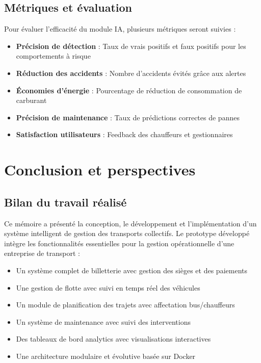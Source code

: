 \documentclass[a4paper, 12pt]{book}
\begin{document}
\section{Métriques et évaluation}

Pour évaluer l'efficacité du module IA, plusieurs métriques seront suivies :

\begin{itemize}
    \item \textbf{Précision de détection} : Taux de vrais positifs et faux positifs pour les comportements à risque
    \item \textbf{Réduction des accidents} : Nombre d'accidents évités grâce aux alertes
    \item \textbf{Économies d'énergie} : Pourcentage de réduction de consommation de carburant
    \item \textbf{Précision de maintenance} : Taux de prédictions correctes de pannes
    \item \textbf{Satisfaction utilisateurs} : Feedback des chauffeurs et gestionnaires
\end{itemize}

\chapter{Conclusion et perspectives}

\section{Bilan du travail réalisé}

Ce mémoire a présenté la conception, le développement et l'implémentation d'un système intelligent de gestion des transports collectifs. Le prototype développé intègre les fonctionnalités essentielles pour la gestion opérationnelle d'une entreprise de transport :

\begin{itemize}
    \item Un système complet de billetterie avec gestion des sièges et des paiements
    \item Une gestion de flotte avec suivi en temps réel des véhicules
    \item Un module de planification des trajets avec affectation bus/chauffeurs
    \item Un système de maintenance avec suivi des interventions
    \item Des tableaux de bord analytics avec visualisations interactives
    \item Une architecture modulaire et évolutive basée sur Docker
\end{itemize}
\end{document}
